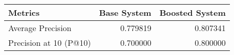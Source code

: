 \begin{tabular}{lrr}
\toprule
               Metrics &  Base System &  Boosted System \\
\midrule
     Average Precision &     0.779819 &        0.807341 \\
Precision at 10 (P@10) &     0.700000 &        0.800000 \\
\bottomrule
\end{tabular}
